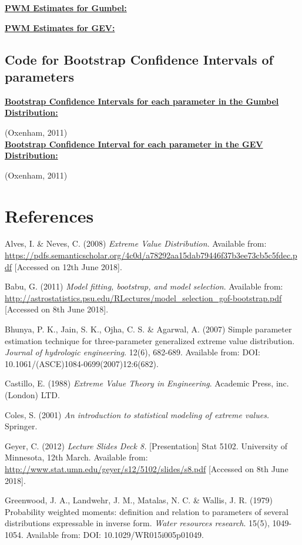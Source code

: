 \documentclass{article}
\begin{document}
\textbf{\underline{PWM Estimates for Gumbel:}}



\textbf{\underline{PWM Estimates for GEV:}}



\subsection{Code for Bootstrap Confidence Intervals of parameters}
\textbf{\underline{Bootstrap Confidence Intervals for each parameter in the Gumbel Distribution:}}

(Oxenham, 2011) \\ 

\textbf{\underline{Bootstrap Confidence Interval for each parameter in the GEV Distribution:}}


(Oxenham, 2011)
\newpage
\section{References}
Alves, I. \& Neves, C. (2008) \textit{Extreme Value Distribution}. Available from: \url{https://pdfs.semanticscholar.org/4c0d/a78292aa15dab79446f37b3ee73cb5c5fdec.pdf} [Accessed on 12th June 2018].

Babu, G. (2011) \textit{Model fitting, bootstrap, and model selection}. Available from: \url{http://astrostatistics.psu.edu/RLectures/model\_selection\_gof-bootstrap.pdf} 
[Accessed on 8th June 2018].

Bhunya, P. K., Jain, S. K., Ojha, C. S. \& Agarwal, A. (2007) Simple parameter 
estimation technique for three-parameter generalized extreme value distribution. 
\textit{Journal of hydrologic engineering}. 12(6), 682-689. Available from: DOI:  
10.1061/(ASCE)1084-0699(2007)12:6(682). 

Castillo, E. (1988) \textit{Extreme Value Theory in Engineering}. Academic Press, inc.(London) LTD.

Coles, S. (2001) \textit{An introduction to statistical modeling of extreme values.} Springer.

Geyer, C. (2012) \textit{Lecture Slides Deck 8.} [Presentation] Stat 5102. University of Minnesota, 12th March. Available from: \url{http://www.stat.umn.edu/geyer/s12/5102/slides/s8.pdf} [Accessed on 8th June 2018].

Greenwood, J. A., Landwehr, J. M., Matalas, N. C. \& Wallis, J. R. (1979) Probability 
weighted moments: definition and relation to parameters of several distributions 
expressable in inverse form. \textit{Water resources research}. 15(5), 1049-1054. 
Available from: DOI: 10.1029/WR015i005p01049. 
\end{document}
